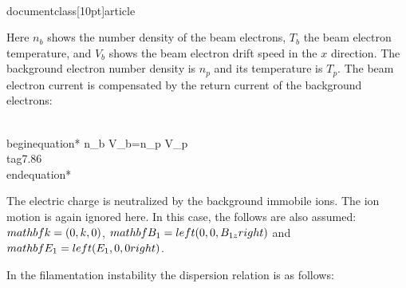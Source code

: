 \\documentclass[10pt]{article}
\begin{document}
{{{{Here $n_{b}$ shows the number density of the beam electrons, $T_{b}$ the beam electron temperature, and $V_{b}$ shows the beam electron drift speed in the $x$ direction. The background electron number density is $n_{p}$ and its temperature is $T_{p}$. The beam electron current is compensated by the return current of the background electrons:


\\begin{equation*}
n_{b} V_{b}=n_{p} V_{p} \\tag{7.86}
\\end{equation*}


The electric charge is neutralized by the background immobile ions. The ion motion is again ignored here. In this case, the follows are also assumed: $\\mathbf{k}=(0, k, 0)$, $\\mathbf{B}_{1}=\\left(0,0, B_{1 z}\\right)$ and $\\mathbf{E}_{1}=\\left(E_{1}, 0,0\\right)$.

In the filamentation instability the dispersion relation is as follows:


}}}}
\end{document}
